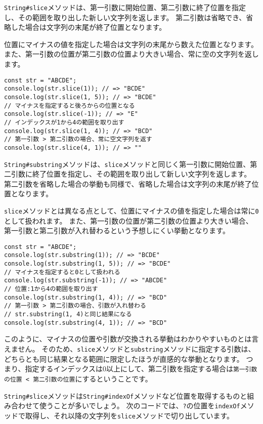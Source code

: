 \texttt{String\#slice}メソッドは、第一引数に開始位置、第二引数に終了位置を指定し、その範囲を取り出した新しい文字列を返します。
第二引数は省略でき、省略した場合は文字列の末尾が終了位置となります。

位置にマイナスの値を指定した場合は文字列の末尾から数えた位置となります。
また、第一引数の位置が第二引数の位置より大きい場合、常に空の文字列を返します。

\begin{lstlisting}
const str = "ABCDE";
console.log(str.slice(1)); // => "BCDE"
console.log(str.slice(1, 5)); // => "BCDE"
// マイナスを指定すると後ろからの位置となる
console.log(str.slice(-1)); // => "E"
// インデックスが1から4の範囲を取り出す
console.log(str.slice(1, 4)); // => "BCD"
// 第一引数 > 第二引数の場合、常に空文字列を返す
console.log(str.slice(4, 1)); // => ""
\end{lstlisting}

\texttt{String\#substring}メソッドは、\texttt{slice}メソッドと同じく第一引数に開始位置、第二引数に終了位置を指定し、その範囲を取り出して新しい文字列を返します。
第二引数を省略した場合の挙動も同様で、省略した場合は文字列の末尾が終了位置となります。

\texttt{slice}メソッドとは異なる点として、位置にマイナスの値を指定した場合は常に\texttt{0}として扱われます。
また、第一引数の位置が第二引数の位置より大きい場合、第一引数と第二引数が入れ替わるという予想しにくい挙動となります。

\begin{lstlisting}
const str = "ABCDE";
console.log(str.substring(1)); // => "BCDE"
console.log(str.substring(1, 5)); // => "BCDE"
// マイナスを指定すると0として扱われる
console.log(str.substring(-1)); // => "ABCDE"
// 位置:1から4の範囲を取り出す
console.log(str.substring(1, 4)); // => "BCD"
// 第一引数 > 第二引数の場合、引数が入れ替わる
// str.substring(1, 4)と同じ結果になる
console.log(str.substring(4, 1)); // => "BCD"
\end{lstlisting}

このように、マイナスの位置や引数が交換される挙動はわかりやすいものとは言えません。
そのため、\texttt{slice}メソッドと\texttt{substring}メソッドに指定する引数は、どちらとも同じ結果となる範囲に限定したほうが直感的な挙動となります。
つまり、指定するインデックスは0以上にして、第二引数を指定する場合は\texttt{第一引数の位置 < 第二引数の位置}にするということです。

\texttt{String\#slice}メソッドは\texttt{String\#indexOf}メソッドなど位置を取得するものと組み合わせて使うことが多いでしょう。
次のコードでは、\texttt{?}の位置を\texttt{indexOf}メソッドで取得し、それ以降の文字列を\texttt{slice}メソッドで切り出しています。

